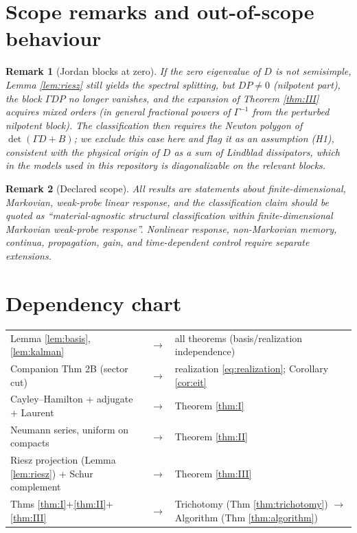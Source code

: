 \documentclass[11pt]{article}
\newtheorem{remark}{Remark}
\begin{document}
\section{Scope remarks and out-of-scope behaviour}

\begin{remark}[Jordan blocks at zero]
If the zero eigenvalue of $D$ is \emph{not} semisimple, Lemma \ref{lem:riesz}
still yields the spectral splitting, but $DP\ne0$ (nilpotent part), the block
$\Gamma DP$ no longer vanishes, and the expansion of Theorem \ref{thm:III}
acquires mixed orders (in general fractional powers of $\Gamma^{-1}$ from the
perturbed nilpotent block). The classification then requires the Newton
polygon of $\det(\Gamma D+B)$; we exclude this case here and flag it as an
assumption (H1), consistent with the physical origin of $D$ as a sum of
Lindblad dissipators, which in the models used in this repository is
diagonalizable on the relevant blocks.
\end{remark}

\begin{remark}[Declared scope]
All results are statements about finite-dimensional, Markovian, weak-probe
linear response, and the classification claim should be quoted as
``material-agnostic structural classification within finite-dimensional
Markovian weak-probe response''. Nonlinear response, non-Markovian memory,
continua, propagation, gain, and time-dependent control require separate
extensions.
\end{remark}

\section*{Dependency chart}

\begin{center}
\begin{tabular}{lll}
Lemma \ref{lem:basis}, \ref{lem:kalman} & $\longrightarrow$ &
 all theorems (basis/realization independence)\\[2pt]
Companion Thm 2B (sector cut) & $\longrightarrow$ &
 realization \eqref{eq:realization}; Corollary \ref{cor:eit}\\[2pt]
Cayley--Hamilton + adjugate + Laurent & $\longrightarrow$ &
 Theorem \ref{thm:I}\\[2pt]
Neumann series, uniform on compacts & $\longrightarrow$ &
 Theorem \ref{thm:II}\\[2pt]
Riesz projection (Lemma \ref{lem:riesz}) + Schur complement
 & $\longrightarrow$ & Theorem \ref{thm:III}\\[2pt]
Thms \ref{thm:I}+\ref{thm:II}+\ref{thm:III} & $\longrightarrow$ &
 Trichotomy (Thm \ref{thm:trichotomy}) $\longrightarrow$
 Algorithm (Thm \ref{thm:algorithm})
\end{tabular}
\end{center}
\end{document}
